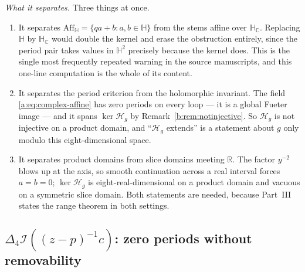 \documentclass[11pt,a4paper]{article}
\numberwithin{equation}{section}
\theoremstyle{definition}
\theoremstyle{remark}
\theoremstyle{plain}
\newcommand{\HH}{\mathbb H}
\newcommand{\HC}{\mathbb H_{\mathbb C}}
\newcommand{\RR}{\mathbb R}
\newcommand{\lap}{\Delta_4}
\newcommand{\I}{\mathcal I}
\newcommand{\Aff}{\mathrm{Aff}_{\HH}}
\newcommand{\Hg}{\mathcal H_{g}}      %
\begin{document}
\emph{What it separates.} Three things at once.
\begin{enumerate}[label=\textup{(\roman*)}]
\item It separates $\Aff=\{qa+b:a,b\in\HH\}$ from the stems affine over
$\HC$. Replacing $\HH$ by $\HC$ would double the kernel and erase the
obstruction entirely, since the period pair takes values in $\HH^2$
precisely because the kernel does. This is the single most frequently
repeated warning in the source manuscripts, and this one-line computation
is the whole of its content.
\item It separates the period criterion from the holomorphic invariant.
The field \eqref{a:eq:complex-affine} has zero periods on every loop --- it
is a global Fueter image --- and it spans $\ker\Hg$ by
Remark~\ref{b:rem:notinjective}. So $\Hg$ is not injective on a product
domain, and ``$\Hg$ extends'' is a statement about $g$ only modulo this
eight-dimensional space.
\item It separates product domains from slice domains meeting $\RR$. The
factor $y^{-2}$ blows up at the axis, so smooth continuation across a real
interval forces $a=b=0$; $\ker\Hg$ is eight-real-dimensional on a product
domain and vacuous on a symmetric slice domain. Both statements are needed,
because Part~III states the range theorem in both settings.
\end{enumerate}

\subsection{$\lap\I((z-p)^{-1}c)$: zero periods without removability}
\label{f:ex:zero-period-pole}
\end{document}
